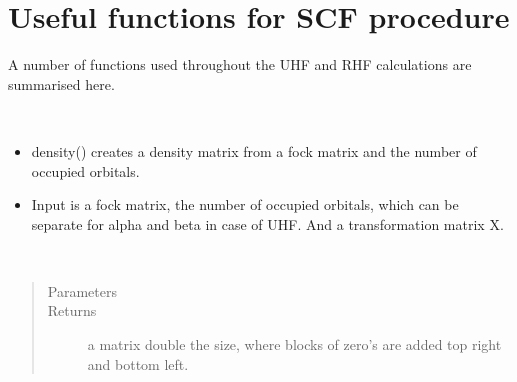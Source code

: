 \documentclass[letterpaper,10pt,english]{sphinxmanual}
\begin{document}
\label{\detokenize{SCF_functions:module-ghf.SCF_functions}}

\chapter{Useful functions for SCF procedure}
\label{\detokenize{SCF_functions:useful-functions-for-scf-procedure}}\label{\detokenize{SCF_functions::doc}}
A number of functions used throughout the UHF and RHF calculations are summarised here.

\begin{fulllineitems}
\label{\detokenize{SCF_functions:ghf.SCF_functions.density_matrix}}~\begin{itemize}
\item {} 
density() creates a density matrix from a fock matrix and the number of occupied orbitals.

\item {} 
Input is a fock matrix, the number of occupied orbitals, which can be separate for alpha and beta in case of UHF.
And a transformation matrix X.

\end{itemize}

\end{fulllineitems}


\begin{fulllineitems}
\label{\detokenize{SCF_functions:ghf.SCF_functions.expand_matrix}}~\begin{quote}\begin{description}
\item[{Parameters}] \leavevmode
{} \textendash{} 

\item[{Returns}] \leavevmode
a matrix double the size, where blocks of zero’s are added top right and bottom left.

\end{description}\end{quote}

\end{fulllineitems}
\end{document}
